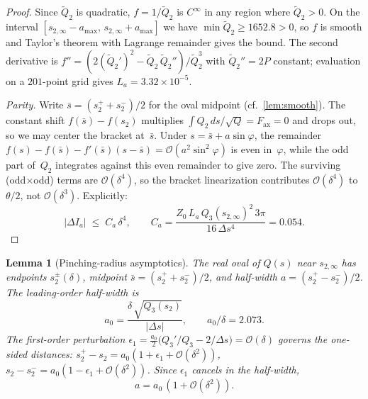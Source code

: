 \documentclass[11pt,a4paper]{article}
\theoremstyle{plain}
\newtheorem{lemma}[theorem]{Lemma}
\theoremstyle{definition}
\theoremstyle{remark}
\newcommand{\Oo}{\mathcal{O}}
\begin{document}
\begin{proof}
  Since $\tilde Q_2$ is quadratic, $f = 1/\tilde Q_2$ is $C^\infty$
  in any region where $\tilde Q_2 > 0$.  On the interval
  $[s_{2,\infty} - a_{\max},\, s_{2,\infty} + a_{\max}]$ we have
  $\min \tilde Q_2 \ge 1652.8 > 0$, so $f$ is smooth and
  Taylor's theorem with Lagrange remainder gives the bound.
  The second derivative is
  $f'' = (2(\tilde Q_2')^2 - \tilde Q_2\,\tilde Q_2'')/\tilde Q_2^3$
  with $\tilde Q_2'' = 2P$ constant; evaluation on a $201$-point
  grid gives $L_a = 3.32 \times 10^{-5}$.

  \smallskip
  \emph{Parity.}  Write $\bar s = (s_2^{+}+s_2^{-})/2$ for the
  oval midpoint (cf.\ \cref{lem:smooth}).  The constant shift
  $f(\bar s) - f(s_2)$ multiplies
  $\int Q_2\,ds/\!\sqrt{Q} = F_{\mathrm{ax}} = 0$
  and drops out, so we may center the bracket at~$\bar s$.
  Under $s = \bar s + a\sin\varphi$,
  the remainder
  $f(s) - f(\bar s) - f'(\bar s)(s{-}\bar s)
  = \Oo(a^2\sin^2\!\varphi)$
  is even in~$\varphi$, while the odd part of~$Q_2$
  integrates against this even remainder to give zero.
  The surviving (odd$\times$odd) terms are $\Oo(\delta^4)$,
  so the bracket linearization contributes $\Oo(\delta^4)$ to
  $\theta/2$, not $\Oo(\delta^3)$.
  Explicitly:
  \[
    \lvert\Delta I_a\rvert
    \;\le\; C_a\,\delta^4,
    \qquad
    C_a
    = \frac{Z_0\,L_a\,Q_3(s_{2,\infty})^2\,3\pi}
           {16\,\Delta s^4}
    = 0.054.
  \]
\end{proof}

\begin{lemma}[Pinching-radius asymptotics]\label{lem:pinching}
  The real oval of $Q(s)$ near $s_{2,\infty}$ has endpoints
  $s_2^\pm(\delta)$, midpoint
  $\bar s = (s_2^{+}+s_2^{-})/2$,
  and half-width $a = (s_2^{+}-s_2^{-})/2$.
  The leading-order half-width is
  \begin{equation}\label{eq:a-expansion}
    a_0
    = \frac{\delta\,\sqrt{Q_3(s_2)}}{\lvert\Delta s\rvert},
    \qquad a_0/\delta = 2.073.
  \end{equation}
  The first-order perturbation
  $\epsilon_1 = \tfrac{a_0}{2}\bigl(Q_3'/Q_3 - 2/\Delta s\bigr)
  = \Oo(\delta)$
  governs the one-sided distances:
  $s_2^{+} - s_2 = a_0(1 + \epsilon_1 + \Oo(\delta^2))$,
  $s_2 - s_2^{-} = a_0(1 - \epsilon_1 + \Oo(\delta^2))$.
  Since $\epsilon_1$ cancels in the half-width,
  \[
    a = a_0\,(1 + \Oo(\delta^2)).
  \]
\end{lemma}
\end{document}
